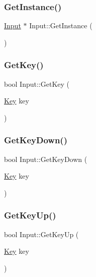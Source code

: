 \subsubsection{\texorpdfstring{GetInstance()}{GetInstance()}}
{\footnotesize\ttfamily \mbox{\hyperlink{class_input}{Input}} $\ast$ Input\+::\+Get\+Instance (\begin{DoxyParamCaption}{ }\end{DoxyParamCaption})\hspace{0.3cm}{\ttfamily [static]}}

\mbox{\label{class_input_a3e693a63675d0aa58cc0fe922dc0a8b2}} 
\subsubsection{\texorpdfstring{GetKey()}{GetKey()}}
{\footnotesize\ttfamily bool Input\+::\+Get\+Key (\begin{DoxyParamCaption}\item[{\mbox{\hyperlink{_input_8h_ab3c7af4820830f9166ede9e5623c4e73}{Key}}}]{key }\end{DoxyParamCaption})\hspace{0.3cm}{\ttfamily [static]}}

\mbox{\label{class_input_a5b29d282d8c937962865527fc886c862}} 
\subsubsection{\texorpdfstring{GetKeyDown()}{GetKeyDown()}}
{\footnotesize\ttfamily bool Input\+::\+Get\+Key\+Down (\begin{DoxyParamCaption}\item[{\mbox{\hyperlink{_input_8h_ab3c7af4820830f9166ede9e5623c4e73}{Key}}}]{key }\end{DoxyParamCaption})\hspace{0.3cm}{\ttfamily [static]}}

\mbox{\label{class_input_a03ee6f16ccae40e4acf900f41e798c4a}} 
\subsubsection{\texorpdfstring{GetKeyUp()}{GetKeyUp()}}
{\footnotesize\ttfamily bool Input\+::\+Get\+Key\+Up (\begin{DoxyParamCaption}\item[{\mbox{\hyperlink{_input_8h_ab3c7af4820830f9166ede9e5623c4e73}{Key}}}]{key }\end{DoxyParamCaption})\hspace{0.3cm}{\ttfamily [static]}}

